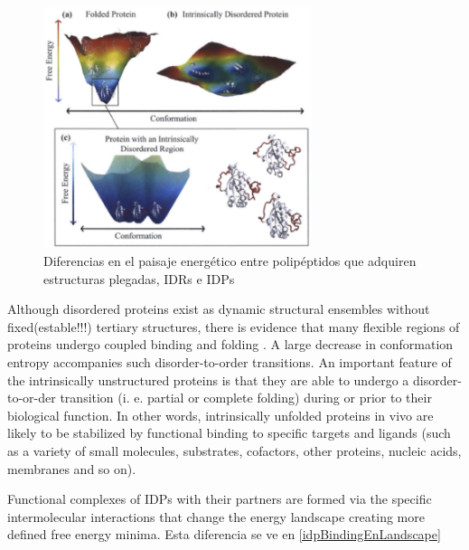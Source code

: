\begin{figure}[h]
\centering
\includegraphics[width=0.7\textwidth]{img/idp-folded-EnLandscape.png} 
\caption{Diferencias en el paisaje energético entre polipéptidos que adquiren estructuras plegadas, IDRs e IDPs }
\label{idp-folded-EnergyLandscape}
\end{figure}







Although disordered proteins exist as dynamic structural ensembles without fixed(estable!!!) tertiary structures, there is evidence that many flexible regions of proteins undergo coupled binding and folding \cite{dyson2005intrinsically}. 
A large decrease in conformation entropy accompanies such disorder-to-order transitions. 
An important feature of the intrinsically unstructured proteins is that they are able to undergo a disorder-to-or-der transition (i. e. partial or complete folding) during or prior to their biological function. 
In other words, intrinsically unfolded proteins in vivo are likely to be stabilized by functional binding to specific targets and ligands (such as a variety of small molecules, substrates, cofactors, other proteins, nucleic acids, membranes and so on). 

Functional complexes of IDPs with their partners are formed via the specific intermolecular interactions that change the energy landscape creating more defined free energy minima.
Esta diferencia se ve en \ref{idpBindingEnLandscape}


